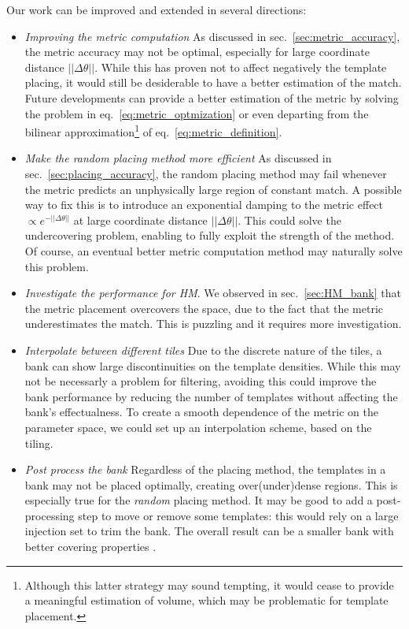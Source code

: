 \documentclass[twocolumn,showpacs,preprintnumbers,nofootinbib,prd,
superscriptaddress,10pt]{revtex4-2}
\begin{document}
Our work can be improved and extended in several directions:
\begin{itemize}
	\item {\it Improving the metric computation} As discussed in sec.~\ref{sec:metric_accuracy}, the metric accuracy may not be optimal, especially for large coordinate distance $||\Delta\theta||$. While this has proven not to affect negatively the template placing, it would still be desiderable to have a better estimation of the match. Future developments can provide a better estimation of the metric by solving the problem in eq.~\eqref{eq:metric_optmization} or even departing from the bilinear approximation\footnote{
Although this latter strategy may sound tempting, it would cease to provide a meaningful estimation of volume, which may be problematic for template placement.} of eq.~\eqref{eq:metric_definition}.
	
	\item {\it Make the random placing method more efficient} As discussed in sec.~\ref{sec:placing_accuracy}, the random placing method may fail whenever the metric predicts an unphysically large region of constant match. A possible way to fix this is to introduce an exponential damping to the metric effect $\propto e^{-||\Delta\theta||}$ at large coordinate distance $||\Delta\theta||$. This could solve the undercovering problem, enabling to fully exploit the strength of the method.
	Of course, an eventual better metric computation method may naturally solve this problem.
	
	\item {\it Investigate the performance for HM}. We observed in sec.~\ref{sec:HM_bank} that the metric placement overcovers the space, due to the fact that the metric underestimates the match. This is puzzling and it requires more investigation.
	
	\item {\it Interpolate between different tiles} Due to the discrete nature of the tiles, a bank can show large discontinuities on the template densities. While this may not be necessarly a problem for filtering, avoiding this could improve the bank performance by reducing the number of templates without affecting the bank's effectualness. To create a smooth dependence of the metric on the parameter space, we could set up an interpolation scheme, based on the tiling.
	
	\item {\it Post process the bank} Regardless of the placing method, the templates in a bank may not be placed optimally, creating over(under)dense regions. This is especially true for the {\it random} placing method. It may be good to add a post-processing step to move or remove some templates: this would rely on a large injection set to trim the bank. The overall result can be a smaller bank with better covering properties \cite{Indik:2017vqq}.
\end{itemize}
\end{document}
